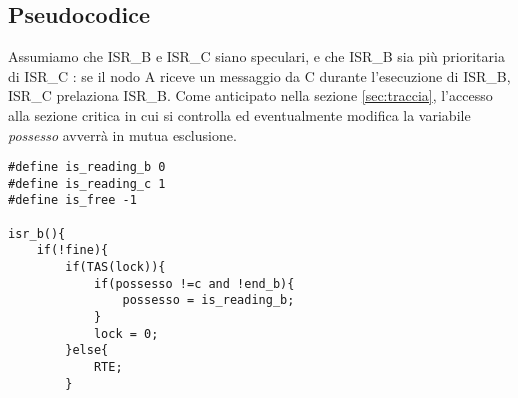 \documentclass{article}
\begin{document}
\subsection{Pseudocodice}
Assumiamo che ISR\_B e ISR\_C siano speculari, e che ISR\_B sia più prioritaria di ISR\_C : se il nodo A riceve un messaggio da C durante l'esecuzione di ISR\_B, ISR\_C prelaziona ISR\_B. Come anticipato nella sezione \ref{sec:traccia}, l'accesso alla sezione critica in cui si controlla ed eventualmente modifica la variabile \textit{possesso} avverrà in mutua esclusione.

\vspace{2\baselineskip}
\begin{lstlisting}
#define is_reading_b 0
#define is_reading_c 1
#define is_free -1

isr_b(){
    if(!fine){
        if(TAS(lock)){
            if(possesso !=c and !end_b){
                possesso = is_reading_b;
            }
            lock = 0;
        }else{
            RTE;
        }


\end{lstlisting}
\end{document}
